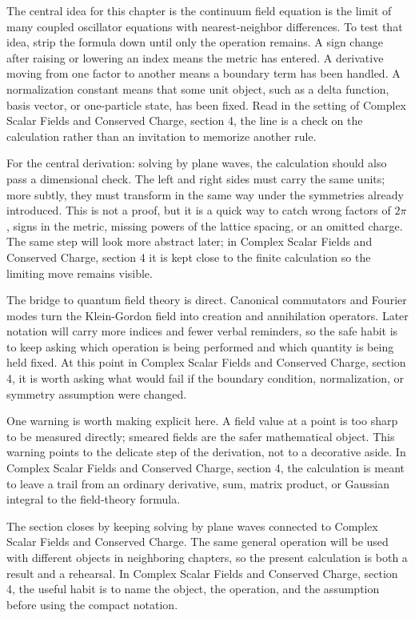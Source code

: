 The central idea for this chapter is the continuum field equation is the limit of many coupled oscillator equations with nearest-neighbor differences.  To test that idea, strip the formula down until only the operation remains.  A sign change after raising or lowering an index means the metric has entered.  A derivative moving from one factor to another means a boundary term has been handled.  A normalization constant means that some unit object, such as a delta function, basis vector, or one-particle state, has been fixed.  Read in the setting of Complex Scalar Fields and Conserved Charge, section 4, the line is a check on the calculation rather than an invitation to memorize another rule.

For the central derivation: solving by plane waves, the calculation should also pass a dimensional check.  The left and right sides must carry the same units; more subtly, they must transform in the same way under the symmetries already introduced.  This is not a proof, but it is a quick way to catch wrong factors of \(2\pi\), signs in the metric, missing powers of the lattice spacing, or an omitted charge.  The same step will look more abstract later; in Complex Scalar Fields and Conserved Charge, section 4 it is kept close to the finite calculation so the limiting move remains visible.

The bridge to quantum field theory is direct.  Canonical commutators and Fourier modes turn the Klein-Gordon field into creation and annihilation operators.  Later notation will carry more indices and fewer verbal reminders, so the safe habit is to keep asking which operation is being performed and which quantity is being held fixed.  At this point in Complex Scalar Fields and Conserved Charge, section 4, it is worth asking what would fail if the boundary condition, normalization, or symmetry assumption were changed.

One warning is worth making explicit here.  A field value at a point is too sharp to be measured directly; smeared fields are the safer mathematical object.  This warning points to the delicate step of the derivation, not to a decorative aside.  In Complex Scalar Fields and Conserved Charge, section 4, the calculation is meant to leave a trail from an ordinary derivative, sum, matrix product, or Gaussian integral to the field-theory formula.

The section closes by keeping solving by plane waves connected to Complex Scalar Fields and Conserved Charge.  The same general operation will be used with different objects in neighboring chapters, so the present calculation is both a result and a rehearsal.  In Complex Scalar Fields and Conserved Charge, section 4, the useful habit is to name the object, the operation, and the assumption before using the compact notation.



